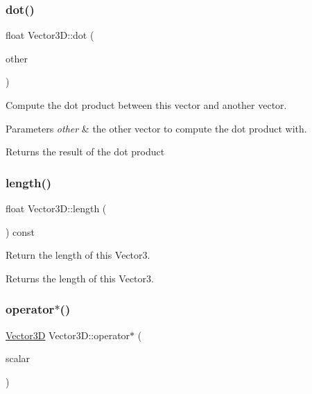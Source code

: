 \subsubsection{\texorpdfstring{dot()}{dot()}}
{\footnotesize\ttfamily float Vector3\+D\+::dot (\begin{DoxyParamCaption}\item[{\hyperlink{classVector3D}{Vector3D}}]{other }\end{DoxyParamCaption})}

Compute the dot product between this vector and another vector.


\begin{DoxyParams}{Parameters}
{\em other} & the other vector to compute the dot product with. \\
\hline
\end{DoxyParams}
\begin{DoxyReturn}{Returns}
the result of the dot product 
\end{DoxyReturn}
\mbox{\label{classVector3D_abccd775509e00038dac9e3a48e74083a}} 
\subsubsection{\texorpdfstring{length()}{length()}}
{\footnotesize\ttfamily float Vector3\+D\+::length (\begin{DoxyParamCaption}{ }\end{DoxyParamCaption}) const}

Return the length of this Vector3.

\begin{DoxyReturn}{Returns}
the length of this Vector3. 
\end{DoxyReturn}
\mbox{\label{classVector3D_abfc0e53bd47939c99aec47831e3255e9}} 
\subsubsection{\texorpdfstring{operator$\ast$()}{operator*()}}
{\footnotesize\ttfamily \hyperlink{classVector3D}{Vector3D} Vector3\+D\+::operator$\ast$ (\begin{DoxyParamCaption}\item[{float}]{scalar }\end{DoxyParamCaption})}

